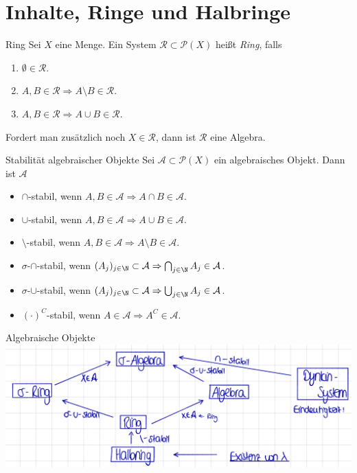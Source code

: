 \section*{Inhalte, Ringe und Halbringe}

\begin{karte}{Ring}
	Sei \(X\) eine Menge. Ein System \(\mathcal{R} \subset \mathcal{P}(X) \) heißt \textit{Ring}, falls 
	\begin{enumerate}
		\item \( \emptyset \in \mathcal{R} \).
		\item \( A,B \in \mathcal{R} \Rightarrow A\setminus B \in \mathcal{R} \).
		\item \( A,B \in \mathcal{R} \Rightarrow A \cup B \in \mathcal{R} \).
	\end{enumerate}
	Fordert man zusätzlich noch \(X \in \mathcal{R}\), dann ist \(\mathcal{R}\) eine Algebra.
\end{karte}

\begin{karte}{Stabilität algebraischer Objekte}
	Sei \( \mathcal{A} \subset \mathcal{P}(X) \) ein algebraisches Objekt. 
	Dann ist \( \mathcal{A} \)
	\begin{itemize}
		\item \(\cap\)-stabil, wenn \( A,B\in \mathcal{A} \Rightarrow A \cap B \in \mathcal{A} \).
		\item \(\cup\)-stabil, wenn \( A,B\in \mathcal{A} \Rightarrow A \cup B \in \mathcal{A} \).
		\item \(\setminus\)-stabil, wenn \( A,B\in \mathcal{A} \Rightarrow A \setminus B \in \mathcal{A} \).
		\item \(\sigma\)-\(\cap\)-stabil, wenn \( (A_j)_{j\in\N} \subset \mathcal{A} \Rightarrow \bigcap_{j\in\N} A_j \in \mathcal{A} \).
		\item \(\sigma\)-\(\cup\)-stabil, wenn \( (A_j)_{j\in\N} \subset \mathcal{A} \Rightarrow \bigcup_{j\in\N} A_j \in \mathcal{A} \).
		\item \( (\cdot)^C\)-stabil, wenn \( A \in \mathcal{A} \Rightarrow A^C \in \mathcal{A} \).
	\end{itemize}
\end{karte}

\begin{karte}{Algebraische Objekte}
	\centering
	\includegraphics[height=0.33\textwidth]{algebraische-objekte-zusammenhang.png}
\end{karte}


